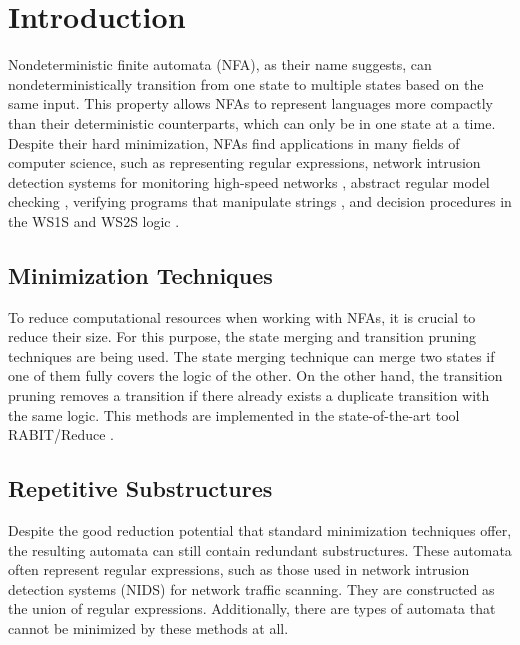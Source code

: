 \documentclass{ExcelAtFIT}
\affiliation{*%
  \href{mailto:xsedym02@stud.fit.vutbr.cz}{xsedym02@stud.fit.vutbr.cz},
  \textit{Faculty of Information Technology, Brno University of Technology}}
\begin{document}
\startdocument


\section{Introduction}
	Nondeterministic finite automata (NFA), as their name suggests, can nondeterministically transition from one state to multiple states based on the same input. This property allows NFAs to represent languages more compactly than their deterministic counterparts, which can only be in one state at a time. Despite their hard minimization, NFAs find applications in many fields of computer science, such as representing regular expressions, network intrusion detection systems for monitoring high-speed networks \cite{FPGA_based_network_scaning, ApproxRed}, abstract regular model checking \cite{ARMC}, verifying programs that manipulate strings \cite{String_constraints_for_ver}, and decision procedures in the WS1S and WS2S logic \cite{On_equivalence_checking, Nested_antichains_for_WS1S}.

	\subsection*{Minimization Techniques}
		To reduce computational resources when working with NFAs, it is crucial to reduce their size. For this purpose, the state merging \cite{Oldest_Merge,Simulation_based_minimization,On_nfa_reduction} and transition pruning \cite{Simulation_based_minimization, Lorenzo_prunning_saturation} techniques are being used. The state merging technique can merge two states if one of them fully covers the logic of the other. On the other hand, the transition pruning removes a transition if there already exists a duplicate transition with the same logic. This methods are implemented in the state-of-the-art tool RABIT/Reduce \cite{RABIT}.

	\subsection*{Repetitive Substructures}
		Despite the good reduction potential that standard minimization techniques offer, the resulting automata can still contain redundant substructures. These automata often represent regular expressions, such as those used in network intrusion detection systems (NIDS) for network traffic scanning. They are constructed as the union of regular expressions. Additionally, there are types of automata that cannot be minimized by these methods at all.
\end{document}
